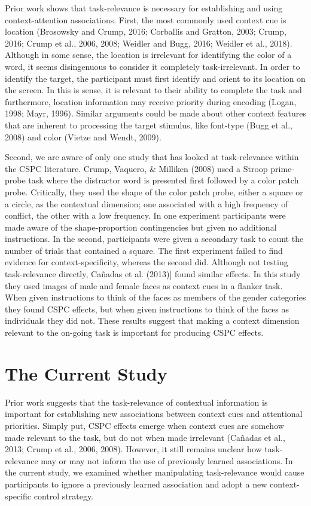 \documentclass[]{DissertateCUNY}
\begin{document}
Prior work shows that task-relevance is necessary for establishing and
using context-attention associations. First, the most commonly used
context cue is location (Brosowsky and Crump, 2016; Corballis and
Gratton, 2003; Crump, 2016; Crump et al., 2006, 2008; Weidler and Bugg,
2016; Weidler et al., 2018). Although in some sense, the location is
irrelevant for identifying the color of a word, it seems disingenuous to
consider it completely task-irrelevant. In order to identify the target,
the participant must first identify and orient to its location on the
screen. In this is sense, it is relevant to their ability to complete
the task and furthermore, location information may receive priority
during encoding (Logan, 1998; Mayr, 1996). Similar arguments could be
made about other context features that are inherent to processing the
target stimulus, like font-type (Bugg et al., 2008) and color (Vietze
and Wendt, 2009).

Second, we are aware of only one study that has looked at task-relevance
within the CSPC literature. Crump, Vaquero, \& Milliken (2008) used a
Stroop prime-probe task where the distractor word is presented first
followed by a color patch probe. Critically, they used the shape of the
color patch probe, either a square or a circle, as the contextual
dimension; one associated with a high frequency of conflict, the other
with a low frequency. In one experiment participants were made aware of
the shape-proportion contingencies but given no additional instructions.
In the second, participants were given a secondary task to count the
number of trials that contained a square. The first experiment failed to
find evidence for context-specificity, whereas the second did. Although
not testing task-relevance directly, Cañadas et al. (2013){]} found
similar effects. In this study they used images of male and female faces
as context cues in a flanker task. When given instructions to think of
the faces as members of the gender categories they found CSPC effects,
but when given instructions to think of the faces as individuals they
did not. These results suggest that making a context dimension relevant
to the on-going task is important for producing CSPC effects.

\hypertarget{the-current-study}{%
\section{The Current Study}\label{the-current-study}}

Prior work suggests that the task-relevance of contextual information is
important for establishing new associations between context cues and
attentional priorities. Simply put, CSPC effects emerge when context
cues are somehow made relevant to the task, but do not when made
irrelevant (Cañadas et al., 2013; Crump et al., 2006, 2008). However, it
still remains unclear how task-relevance may or may not inform the use
of previously learned associations. In the current study, we examined
whether manipulating task-relevance would cause participants to ignore a
previously learned association and adopt a new context-specific control
strategy.
\end{document}
